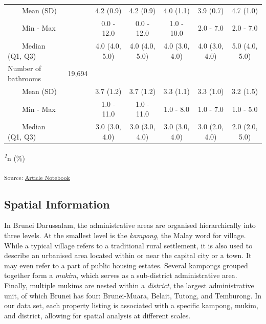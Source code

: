 \documentclass[
  number]{elsarticle}
\begin{document}
\begin{landscape}
\begin{table}
{\begin{tabular*}{\linewidth}{@{\extracolsep{\fill}}lcccccc}
    Mean (SD) &  & 4.2 (0.9) & 4.2 (0.9) & 4.0 (1.1) & 3.9 (0.7) & 4.7 (1.0) \\ 
    Min - Max &  & 0.0 - 12.0 & 0.0 - 12.0 & 1.0 - 10.0 & 2.0 - 7.0 & 2.0 - 7.0 \\ 
    Median (Q1, Q3) &  & 4.0 (4.0, 5.0) & 4.0 (4.0, 5.0) & 4.0 (3.0, 4.0) & 4.0 (3.0, 4.0) & 5.0 (4.0, 5.0) \\ 
Number of bathrooms & 19,694 &  &  &  &  &  \\ 
    Mean (SD) &  & 3.7 (1.2) & 3.7 (1.2) & 3.3 (1.1) & 3.3 (1.0) & 3.2 (1.5) \\ 
    Min - Max &  & 1.0 - 11.0 & 1.0 - 11.0 & 1.0 - 8.0 & 1.0 - 7.0 & 1.0 - 5.0 \\ 
    Median (Q1, Q3) &  & 3.0 (3.0, 4.0) & 3.0 (3.0, 4.0) & 3.0 (3.0, 4.0) & 3.0 (2.0, 4.0) & 2.0 (2.0, 5.0) \\ 
\bottomrule
\end{tabular*}
\begin{minipage}{\linewidth}
\textsuperscript{\textit{1}}n (\%)\\
\end{minipage}

\textsubscript{Source:
\href{https://Bruneiverse.github.io/house-data/manuscript-preview.html}{Article
Notebook}}

}

\end{table}%

\end{landscape}

\subsection{Spatial Information}\label{spatial-information}

In Brunei Darussalam, the administrative areas are organised
hierarchically into three levels. At the smallest level is the
\emph{kampong}, the Malay word for village. While a typical village
refers to a traditional rural settlement, it is also used to describe an
urbanised area located within or near the capital city or a town. It may
even refer to a part of public housing estates. Several kampongs grouped
together form a \emph{mukim}, which serves as a sub-district
administrative area. Finally, multiple mukims are nested within a
\emph{district}, the largest administrative unit, of which Brunei has
four: Brunei-Muara, Belait, Tutong, and Temburong. In our data set, each
property listing is associated with a specific kampong, mukim, and
district, allowing for spatial analysis at different scales.
\end{document}
